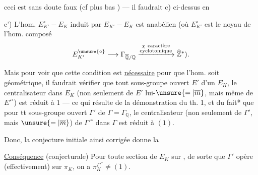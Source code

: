 ceci est sans doute faux (cf plus bas ) --- il faudrait    c) ci-dessus en

c') L'hom. $E_{K'}^\circ-E_K$ induit par $E_{K'}-E_K$ est anabélien (où $E_{K'}^\circ$ est le noyau de l'hom. composé
\[
E_{K'}^{\unsure{\circ}}\longrightarrow\Gamma_{\overline{\mathbb Q}/\mathbb Q}\xrightarrow{\substack{\chi\ \text{caractère}\\\text{cyclotomique}}}\widehat{\mathbb Z}^{*}).
\]

Mais pour voir que cette condition est \uline{nécessaire} pour que l'hom. soit géométrique, il faudrait  vérifier que  tout sous-groupe ouvert $E'$ d'un $E_K$, le centralisateur dans $E_K$ (non seulement de $E'$ lui-$\unsure{=|\overline m}$, mais même de $E'^\circ$) est réduit à $1$ --- ce qui résulte de la démonstration du th. 1, et du fait* que pour tt sous-groupe ouvert $\Gamma'$ de $\Gamma=\Gamma_{\mathbb Q}$, le centralisateur (non seulement de $\Gamma'$, mais $\unsure{=|\overline m}$) de $\Gamma'^\circ$ dans $\Gamma$ est réduit à $(1)$.

Donc, la conjecture initiale ainsi corrigée donne la

\uline{Conséquence} (conjecturale) Pour toute  section de $E_K$ sur  , de sorte que $\Gamma'$ opère (effectivement) sur $\pi_K$, on a  $\pi_K^{\Gamma'^\circ}\ne(1)$.
